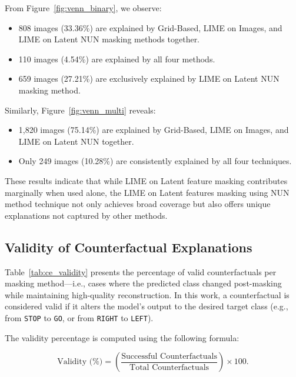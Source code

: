 From Figure~\ref{fig:venn_binary}, we observe:
\begin{itemize}
    \item 808 images (33.36\%) are explained by Grid-Based, LIME on Images, and LIME on Latent NUN masking methods together.
    \item 110 images (4.54\%) are explained by all four methods.
    \item 659 images (27.21\%) are exclusively explained by LIME on Latent NUN masking method.
\end{itemize}

Similarly, Figure~\ref{fig:venn_multi} reveals:
\begin{itemize}
    \item 1,820 images (75.14\%) are explained by Grid-Based, LIME on Images, and LIME on Latent NUN together.
    \item Only 249 images (10.28\%) are consistently explained by all four techniques.
\end{itemize}

These results indicate that while LIME on Latent feature masking contributes marginally when used alone, the LIME on Latent features masking using NUN method technique not only achieves broad coverage but also offers unique explanations not captured by other methods.


\subsection{Validity of Counterfactual Explanations}
Table~\ref{tab:ce_validity} presents the percentage of valid counterfactuals per masking method---i.e., cases where the predicted class changed post-masking while maintaining high-quality reconstruction. In this work, a counterfactual is considered valid if it alters the model’s output to the desired target class (e.g., from \texttt{STOP} to \texttt{GO}, or from \texttt{RIGHT} to \texttt{LEFT}).

The validity percentage is computed using the following formula:

\[
\text{Validity (\%)} = \left( \frac{\text{Successful Counterfactuals}}{\text{Total Counterfactuals}} \right) \times 100.
\]

